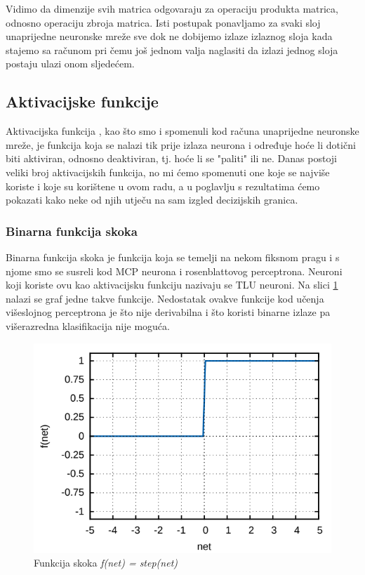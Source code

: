 \documentclass[times, utf8, zavrsni]{fer}
\begin{document}
Vidimo da dimenzije svih matrica odgovaraju za operaciju produkta matrica, odnosno operaciju zbroja matrica. Isti postupak ponavljamo za svaki sloj unaprijedne neuronske mreže sve dok ne dobijemo izlaze izlaznog sloja kada stajemo sa računom pri čemu još jednom valja naglasiti da izlazi jednog sloja postaju ulazi onom sljedećem.

\subsection{Aktivacijske funkcije}
Aktivacijska funkcija , kao što smo i spomenuli kod računa unaprijedne neuronske mreže, je funkcija koja se nalazi tik prije izlaza neurona i određuje hoće li dotični biti aktiviran, odnosno deaktiviran, tj. hoće li se "paliti" ili ne. Danas postoji veliki broj aktivacijskih funkcija, no mi ćemo spomenuti one koje se najviše koriste i koje su korištene u ovom radu, a u poglavlju s rezultatima ćemo pokazati kako neke od njih utječu na sam izgled decizijskih granica.

\subsubsection{Binarna funkcija skoka}
Binarna funkcija skoka  je funkcija koja se temelji na nekom fiksnom pragu i s njome smo se susreli kod MCP neurona i rosenblattovog perceptrona. Neuroni koji koriste ovu kao aktivacijsku funkciju nazivaju se TLU  neuroni. Na slici \ref{fig:step-fun} nalazi se graf jedne takve funkcije. Nedostatak ovakve funkcije kod učenja višeslojnog perceptrona je što nije derivabilna i što koristi binarne izlaze pa višerazredna klasifikacija nije moguća. 

\begin{figure}[H]
    \centering
    \includegraphics[scale=0.5]{img/step-fun.png}
    \caption[Caption for LOF]{Funkcija skoka \textit{f(net) = step(net)}\footnotemark}
    \label{fig:step-fun}
\end{figure}
\end{document}
